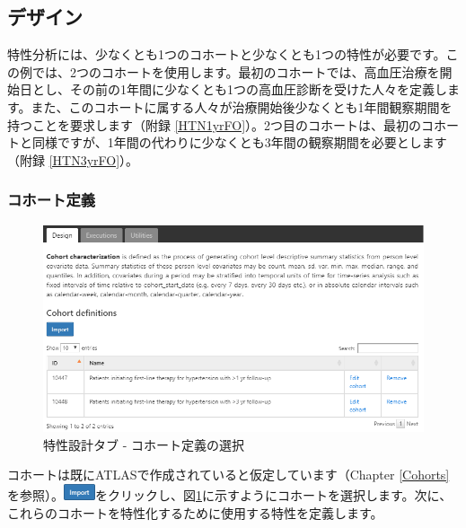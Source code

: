 \documentclass[
  11pt]{book}
\theoremstyle{definition}
\theoremstyle{definition}
\theoremstyle{definition}
\theoremstyle{definition}
\theoremstyle{remark}
\begin{document}
\subsection{デザイン}\label{ux30c7ux30b6ux30a4ux30f3}

特性分析には、少なくとも1つのコホートと少なくとも1つの特性が必要です。この例では、2つのコホートを使用します。最初のコホートでは、高血圧治療を開始日とし、その前の1年間に少なくとも1つの高血圧診断を受けた人々を定義します。また、このコホートに属する人々が治療開始後少なくとも1年間観察期間を持つことを要求します（附録 \ref{HTN1yrFO}）。2つ目のコホートは、最初のコホートと同様ですが、1年間の代わりに少なくとも3年間の観察期間を必要とします（附録 \ref{HTN3yrFO}）。

\subsubsection*{コホート定義}\label{ux30b3ux30dbux30fcux30c8ux5b9aux7fa9}

\begin{figure}

{\centering \includegraphics[width=1\linewidth]{images/Characterization/atlasCharacterizationCohortSelection} 

}

\caption{特性設計タブ - コホート定義の選択}\label{fig:atlasCharacterizationCohortSelection}
\end{figure}

コホートは既にATLASで作成されていると仮定しています（Chapter \ref{Cohorts}を参照）。\includegraphics{images/Characterization/atlasImportButton.png}をクリックし、図\ref{fig:atlasCharacterizationCohortSelection}に示すようにコホートを選択します。次に、これらのコホートを特性化するために使用する特性を定義します。
\end{document}
